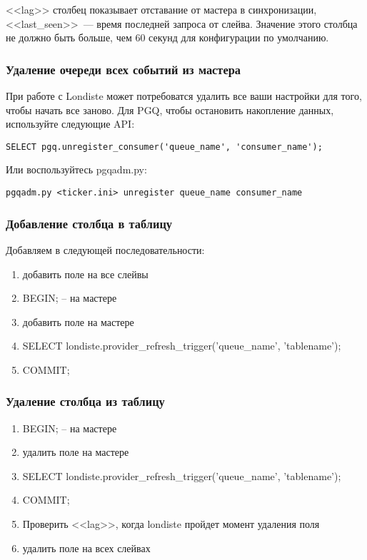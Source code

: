 <<lag>> столбец показывает отставание от мастера в синхронизации, 
<<last\_seen>>~--- время последней запроса от слейва. Значение этого столбца не должно быть больше, 
чем 60 секунд для конфигурации по умолчанию.

\subsubsection{Удаление очереди всех событий из мастера}
При работе с Londiste может потребоватся удалить все ваши настройки для того, чтобы начать все заново. 
Для PGQ, чтобы остановить накопление данных, используйте следующие API:
\begin{lstlisting}[label=lst:londiste22,caption=Удаление очереди всех событий из мастера]
SELECT pgq.unregister_consumer('queue_name', 'consumer_name');
\end{lstlisting}

Или воспользуйтесь pgqadm.py:
\begin{lstlisting}[label=lst:londiste23,caption=Удаление очереди всех событий из мастера]
pgqadm.py <ticker.ini> unregister queue_name consumer_name
\end{lstlisting}

\subsubsection{Добавление столбца в таблицу}
Добавляем в следующей последовательности:
\begin{enumerate}
 \item добавить поле на все слейвы
 \item BEGIN; -- на мастере
 \item добавить поле на мастере
 \item SELECT londiste.provider\_refresh\_trigger('queue\_name', 'tablename');
 \item COMMIT;
\end{enumerate}

\subsubsection{Удаление столбца из таблицу}
\begin{enumerate}
 \item BEGIN; -- на мастере
 \item удалить поле на мастере
 \item SELECT londiste.provider\_refresh\_trigger('queue\_name', 'tablename');
 \item COMMIT;
 \item Проверить <<lag>>, когда londiste пройдет момент удаления поля
 \item удалить поле на всех слейвах
\end{enumerate}

